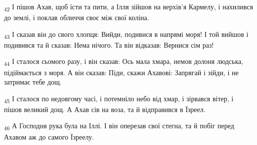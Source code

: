 \begin{tcolorbox}
\textsubscript{42} І пішов Ахав, щоб їсти та пити, а Ілля зійшов на верхів'я Кармелу, і нахилився до землі, і поклав обличчя своє між свої коліна.
\end{tcolorbox}
\begin{tcolorbox}
\textsubscript{43} І сказав він до свого хлопця: Вийди, подивися в напрямі моря! І той вийшов і подивився та й сказав: Нема нічого. Та він відказав: Вернися сім раз!
\end{tcolorbox}
\begin{tcolorbox}
\textsubscript{44} І сталося сьомого разу, і він сказав: Ось мала хмара, немов долоня людська, підіймається з моря. А він сказав: Піди, скажи Ахавові: Запрягай і зійди, і не затримає тебе дощ.
\end{tcolorbox}
\begin{tcolorbox}
\textsubscript{45} І сталося по недовгому часі, і потемніло небо від хмар, і зірвався вітер, і пішов великий дощ. А Ахав сів на воза, та й відправився в Їзреел.
\end{tcolorbox}
\begin{tcolorbox}
\textsubscript{46} А Господня рука була на Іллі. І він оперезав свої стегна, та й побіг перед Ахавом аж до самого Їзреелу.
\end{tcolorbox}
